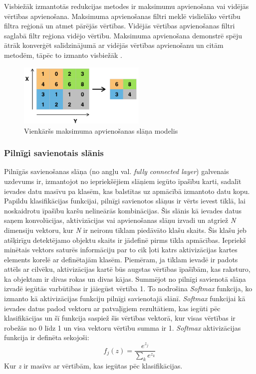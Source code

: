 Visbiežāk izmantotās redukcijas metodes ir maksimumu apvienošana vai vidējās vērtības apvienošana. Maksimuma apvienošanas filtri meklē vislielāko vērtību filtra reģionā un atmet pārējās vērtības. Vidējās vērtības apvienošanas filtri saglabā filtr reģiona vidējo vērtību. Maksimuma apvienošana demonstrē spēju ātrāk konverģēt salīdzinājumā ar vidējās vērtības apvienošanu un citām metodēm, tāpēc to izmanto visbiežāk \cite{scherer2010evaluation}. 
\begin{figure}[h]%
	\centering
	\includegraphics[height=3cm]{images/maxpool.png} %
	\caption{Vienkāršs maksimuma apvienošanas slāņa modelis \cite{maxpool}}%
	\label{fig:example}%
\end{figure}
\subsubsection{Pilnīgi savienotais slānis}
Pilnīgās savienošanas slāņa (no angļu val. \textit{fully connected layer}) galvenais uzdevums ir, izmantojot no iepriekšējiem slāņiem iegūto īpašību karti, sadalīt ievades datu masīvu pa klasēm, kas balstītas uz apmācībā izmantoto datu kopu. Papildu klasifikācijas funkcijai, pilnīgi savienotos slāņus ir vērts ievest tīklā, lai noskaidrotu īpašību karšu nelineārās kombinācijas. Šis slānis kā ievades datus saņem konvolūcijas, aktivizācijas vai apvienošanas slāņu izvadi un atgriež \textit{N} dimensiju vektoru, kur \textit{N} ir neironu tīklam piedāvāto klašu skaits. Šis klašu jeb atšķirīgu detektējamo objektu skaits ir jādefinē pirms tīkla apmācības. Iepriekš minētais vektors saturēs informāciju par to cik ļoti katrs aktivizācijas kartes elements korelē ar definētajām klasēm. Piemēram, ja tīklam ievadē ir padots attēls ar cilvēku, aktivizācijas kartē būs augstas vērtības īpašībām, kas raksturo, ka objektam ir divas rokas un divas kājas. Summējot no pilnīgi savienotā slāņa izvadē iegūtās varbūtības ir jāiegūst vērtība 1. To nodrošina \textit{Softmax} funkcija, ko izmanto kā aktivizācijas funkciju pilnīgi savienotajā slānī. \textit{Softmax} funkcijai kā ievades datus padod vektoru ar patvaļīgiem rezultātiem, kas iegūti pēc klasifikācijas un šī funkcija saspiež šīs vērtības vektorā, kur visas vērtības ir robežās no 0 līdz 1 un visa vektoru vērtību summa ir 1. \textit{Softmax} aktivizācijas funkcija ir definēta sekojoši:
\[f_j(z) = \frac{e^{z_j}}{\sum_k e^{z_k}} \]
Kur \textit{z} ir masīvs ar vērtībām, kas iegūtas pēc klasifikācijas.
